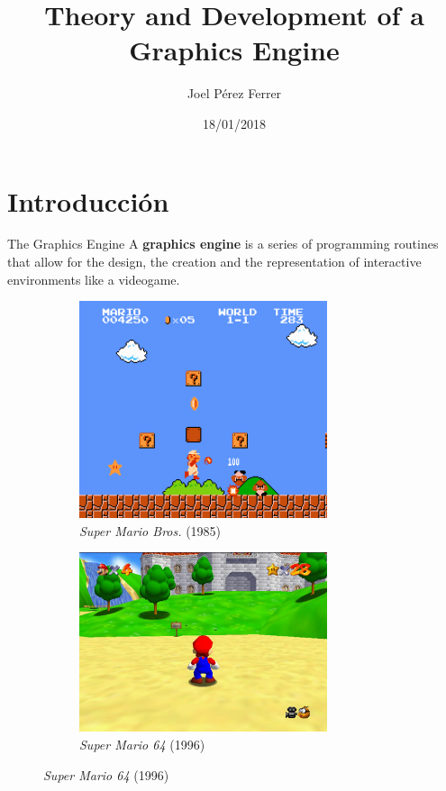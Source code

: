 \documentclass{beamer}
\title[Theory and Development of Graphics Engine]{Theory and Development of a Graphics Engine}
\author{Joel Pérez Ferrer}
\institute{Institut de Bruguers}
\date{18/01/2018}
\begin{document}
\begin{frame}
  \titlepage
\end{frame}

\section{Introducción}
\begin{frame}{The Graphics Engine}
  A \textbf{graphics engine} is a series of programming routines that allow for the design, the creation and the representation of interactive environments like a videogame.
  
\begin{figure} [h]
  \centering
  \captionsetup[subfigure]{justification=centering}
  \begin{subfigure}{0.4\textwidth}
    \centering
    \includegraphics[width=0.8\textwidth]{img/supermario} 
    \caption{\textit{Super Mario Bros.} (1985)}
  \end{subfigure}
  \begin{subfigure}{0.4\textwidth}
    \centering
    \includegraphics[width=0.8\textwidth]{img/mario64} 
    \caption{\textit{Super Mario 64} (1996)}
  \end{subfigure}
\end{figure}
\end{frame}
\end{document}
